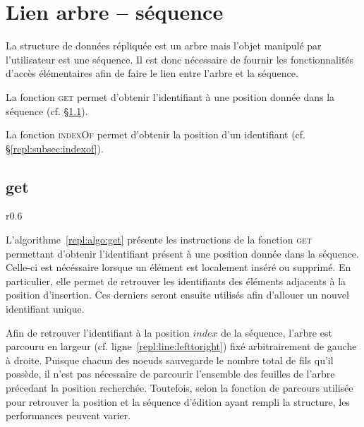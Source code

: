 
\clearpage

\section{Lien arbre -- séquence}

La structure de données répliquée est un arbre mais l'objet manipulé par
l'utilisateur est une séquence. Il est donc nécessaire de fournir les
fonctionnalités d'accès élémentaires afin de faire le lien entre l'arbre et la
séquence.
\begin{inparaenum}[(i)]
\item La fonction \textsc{get} permet d'obtenir l'identifiant à une position
  donnée dans la séquence (cf. §\ref{repl:subsec:get}).
\item La fonction \textsc{indexOf} permet d'obtenir la position d'un
  identifiant (cf. §\ref{repl:subsec:indexof}).
\end{inparaenum}

\subsection{get}
\label{repl:subsec:get}

\begin{wrapfigure}{r}{0.6\textwidth}
  \vspace{-35pt} %
  \begin{minipage}[t]{0.6\textwidth}
    \begin{algorithm}[H]
      
      \caption{\label{repl:algo:get} Get.}
    \end{algorithm}
  \end{minipage}
  \vspace{-15pt}
\end{wrapfigure}

L'algorithme~\ref{repl:algo:get} présente les instructions de la fonction
\textsc{get} permettant d'obtenir l'identifiant présent à une position donnée
dans la séquence. Celle-ci est nécéssaire lorsque un élément est localement
inséré ou supprimé. En particulier, elle permet de retrouver les identifiants
des éléments adjacents à la position d'insertion. Ces derniers seront ensuite
utilisés afin d'allouer un nouvel identifiant unique.

Afin de retrouver l'identifiant à la position $index$ de la séquence, l'arbre
est parcouru en largeur (cf. ligne~\ref{repl:line:lefttoright}) fixé
arbitrairement de gauche à droite.  Puisque chacun des noeuds sauvegarde le
nombre total de fils qu'il possède, il n'est pas nécessaire de parcourir
l'ensemble des feuilles de l'arbre précedant la position recherchée. Toutefois,
selon la fonction de parcours utilisée pour retrouver la position et la séquence
d'édition ayant rempli la structure, les performances peuvent varier.

